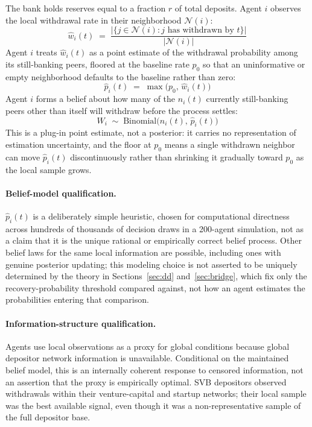 \documentclass[12pt]{article}\usepackage[]{graphicx}\usepackage[]{xcolor}
\begin{document}
The bank holds reserves equal to a fraction $r$ of total deposits.
Agent $i$ observes the local withdrawal rate in their neighborhood $\mathcal{N}(i)$:
%
\begin{equation}
  \hat{w}_i(t) \;=\;
  \frac{\bigl|\{j \in \mathcal{N}(i) : j \text{ has withdrawn by }
  t\}\bigr|}{|\mathcal{N}(i)|}
  \label{eq:localrate}
\end{equation}
%
Agent $i$ treats $\hat{w}_i(t)$ as a point estimate of the withdrawal probability among its still-banking peers, floored at the baseline rate $p_0$ so that an uninformative or empty neighborhood defaults to the baseline rather than zero:
%
\begin{equation}
  \hat{p}_i(t) \;=\; \max\bigl(p_0,\, \hat{w}_i(t)\bigr)
  \label{eq:pointestimate}
\end{equation}
%
Agent $i$ forms a belief about how many of the $n_i(t)$ currently still-banking peers other than itself will withdraw before the process settles:
%
\begin{equation}
  W_i \;\sim\; \mathrm{Binomial}\bigl(n_i(t),\, \hat{p}_i(t)\bigr)
  \label{eq:belief}
\end{equation}
%
This is a plug-in point estimate, not a posterior: it carries no representation of estimation uncertainty, and the floor at $p_0$ means a single withdrawn neighbor can move $\hat{p}_i(t)$ discontinuously rather than shrinking it gradually toward $p_0$ as the local sample grows.

\paragraph{Belief-model qualification.}
$\hat{p}_i(t)$ is a deliberately simple heuristic, chosen for computational directness across hundreds of thousands of decision draws in a 200-agent simulation, not as a claim that it is the unique rational or empirically correct belief process.
Other belief laws for the same local information are possible, including ones with genuine posterior updating; this modeling choice is not asserted to be uniquely determined by the theory in Sections~\ref{sec:dd} and~\ref{sec:bridge}, which fix only the recovery-probability threshold compared against, not how an agent estimates the probabilities entering that comparison.

\paragraph{Information-structure qualification.}
Agents use local observations as a proxy for global conditions because global depositor network information is unavailable.
Conditional on the maintained belief model, this is an internally coherent response to censored information, not an assertion that the proxy is empirically optimal.
SVB depositors observed withdrawals within their venture-capital and startup networks; their local sample was the best available signal, even though it was a non-representative sample of the full depositor base.
\end{document}

